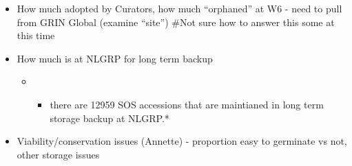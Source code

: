 \documentclass[]{article}
\providecommand{\tightlist}{%
  \setlength{\itemsep}{0pt}\setlength{\parskip}{0pt}}
\begin{document}
\begin{itemize}
\item
  How much adopted by Curators, how much ``orphaned'' at W6 - need to
  pull from GRIN Global (examine ``site'') \#Not sure how to answer this
  some at this time
\item
  How much is at NLGRP for long term backup

  \begin{itemize}
  \item
    \begin{itemize}
    \tightlist
    \item
      there are 12959 SOS accessions that are maintianed in long term
      storage backup at NLGRP.*
    \end{itemize}
  \end{itemize}
\item
  Viability/conservation issues (Annette) - proportion easy to germinate
  vs not, other storage issues
\end{itemize}
\end{document}
